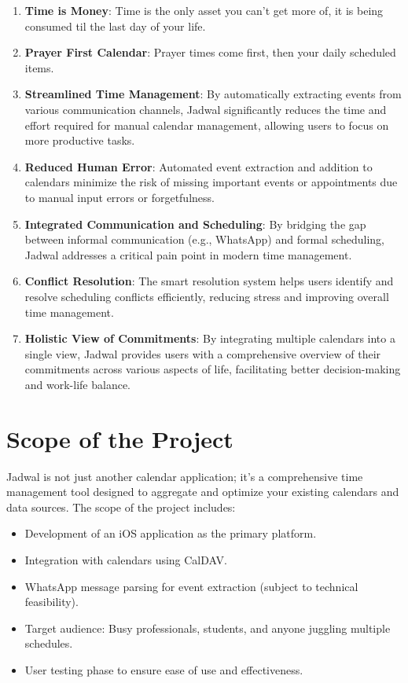 \documentclass[12pt,a4paper]{article}
\begin{document}
\begin{enumerate}
    \item \textbf{Time is Money}: Time is the only asset you can't get more of, it is being consumed til the last day of your life.
    \item \textbf{Prayer First Calendar}: Prayer times come first, then your daily scheduled items.
    \item \textbf{Streamlined Time Management}: By automatically extracting events from various communication channels, Jadwal significantly reduces the time and effort required for manual calendar management, allowing users to focus on more productive tasks.
    \item \textbf{Reduced Human Error}: Automated event extraction and addition to calendars minimize the risk of missing important events or appointments due to manual input errors or forgetfulness.
    \item \textbf{Integrated Communication and Scheduling}: By bridging the gap between informal communication (e.g., WhatsApp) and formal scheduling, Jadwal addresses a critical pain point in modern time management.
    \item \textbf{Conflict Resolution}: The smart resolution system helps users identify and resolve scheduling conflicts efficiently, reducing stress and improving overall time management.
    \item \textbf{Holistic View of Commitments}: By integrating multiple calendars into a single view, Jadwal provides users with a comprehensive overview of their commitments across various aspects of life, facilitating better decision-making and work-life balance.
\end{enumerate}

\section{Scope of the Project}

Jadwal is not just another calendar application; it's a comprehensive time management tool designed to aggregate and optimize your existing calendars and data sources. The scope of the project includes:

\begin{itemize}
    \item Development of an iOS application as the primary platform.
    \item Integration with calendars using CalDAV.
    \item WhatsApp message parsing for event extraction (subject to technical feasibility).
    \item Target audience: Busy professionals, students, and anyone juggling multiple schedules.
    \item User testing phase to ensure ease of use and effectiveness.
\end{itemize}
\end{document}
